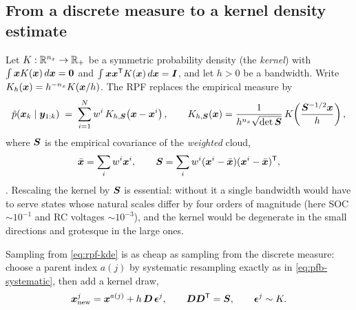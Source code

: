 \subsection{From a discrete measure to a kernel density estimate}
Let $K:\mathbb{R}^{n_x}\to\mathbb{R}_+$ be a symmetric probability density (the \emph{kernel}) with
$\int \bm{x} K(\bm{x})\,d\bm{x} = \bm 0$ and $\int \bm{x}\bm{x}^{\mathsf{T}} K(\bm{x})\, d\bm{x} = \bm{I}$, and let $h>0$ be a
bandwidth.  Write $K_h(\bm{x}) = h^{-n_x} K(\bm{x}/h)$.  The RPF replaces the empirical measure by
\begin{equation}
  \hat p(\bm{x}_k\mid\bm{y}_{1:k}) \;=\; \sum_{i=1}^{N} w^i\, K_{h,\bm{S}}\!\left(\bm{x} - \bm{x}^i\right),
  \qquad
  K_{h,\bm{S}}(\bm{x}) = \frac{1}{h^{n_x}\sqrt{\det \bm{S}}}\, K\!\left(\frac{\bm{S}^{-1/2}\bm{x}}{h}\right),
  \label{eq:rpf-kde}
\end{equation}
where $\bm{S}$ is the empirical covariance of the \emph{weighted} cloud,
\begin{equation}
  \bar{\bm{x}} = \sum_i w^i \bm{x}^i, \qquad
  \bm{S} = \sum_i w^i (\bm{x}^i - \bar{\bm{x}})(\bm{x}^i-\bar{\bm{x}})^{\mathsf{T}} ,
  \label{eq:rpf-S}
\end{equation}
\cite[eqs.~(12)--(14)]{musso2001regularized}.  Rescaling the kernel by $\bm{S}$ is essential: without
it a single bandwidth would have to serve states whose natural scales differ by four orders of
magnitude (here SOC $\sim 10^{-1}$ and RC voltages $\sim 10^{-3}$), and the kernel would be
degenerate in the small directions and grotesque in the large ones.

Sampling from \eqref{eq:rpf-kde} is as cheap as sampling from the discrete measure: choose a parent
index $a(j)$ by systematic resampling exactly as in \eqref{eq:pfb-systematic}, then add a kernel
draw,
\begin{equation}
  \bm{x}^j_{\mathrm{new}} = \bm{x}^{a(j)} + h\, \bm{D}\, \bm{\epsilon}^j,
  \qquad \bm{D}\bm{D}^{\mathsf{T}} = \bm{S}, \qquad \bm{\epsilon}^j \sim K .
  \label{eq:rpf-draw}
\end{equation}

